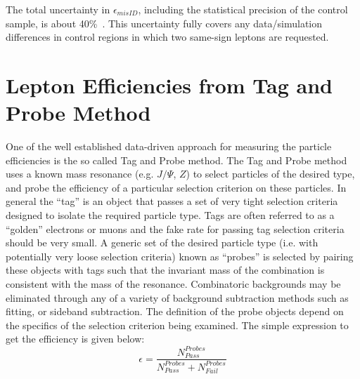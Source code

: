 The total uncertainty in  $\epsilon_{misID}$, 
including the statistical precision of the control sample, is about 40\%~\cite{Sirunyan:2018egh}. 
This uncertainty fully covers any data/simulation differences in control regions in which two same-sign leptons are requested.



\section{Lepton Efficiencies from Tag and Probe Method}
\label{TP}
One of the well established data-driven approach for measuring the particle efficiencies is the
so called Tag and Probe method. The Tag and Probe method uses a known mass resonance (e.g. $J/\Psi$, $Z$) to select particles of the desired type, and probe the efficiency of a particular
selection criterion on these particles. In general the “tag” is an object that passes a set of very
tight selection criteria designed to isolate the required particle type. Tags are often referred
to as a “golden” electrons or muons and the fake rate for passing tag selection criteria should
be very small. A generic set of the desired particle type (i.e. with potentially very loose selection 
criteria) known as “probes” is selected by pairing these objects with tags such that the
invariant mass of the combination is consistent with the mass of the resonance. Combinatoric
backgrounds may be eliminated through any of a variety of background subtraction methods
such as fitting, or sideband subtraction. The definition of the probe objects depend on the specifics of the selection criterion being examined. The simple expression to get the efficiency %
is given below:
\begin{equation}
\epsilon=\frac{N_{Pass}^{Probes}}{N_{Pass}^{Probes}+N_{Fail}^{Probes}}
\end{equation}

